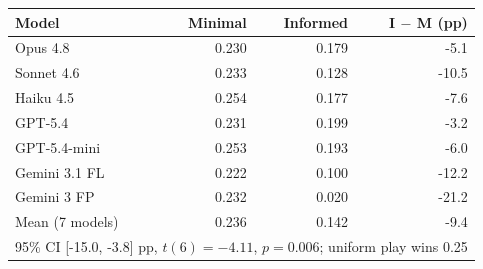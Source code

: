 \begin{tabular}{lrrr}
\toprule
Model & Minimal & Informed & I $-$ M (pp) \\
\midrule
Opus 4.8 & 0.230 & 0.179 & -5.1 \\
Sonnet 4.6 & 0.233 & 0.128 & -10.5 \\
Haiku 4.5 & 0.254 & 0.177 & -7.6 \\
GPT-5.4 & 0.231 & 0.199 & -3.2 \\
GPT-5.4-mini & 0.253 & 0.193 & -6.0 \\
Gemini 3.1 FL & 0.222 & 0.100 & -12.2 \\
Gemini 3 FP & 0.232 & 0.020 & -21.2 \\
\midrule
Mean (7 models) & 0.236 & 0.142 & -9.4 \\
\multicolumn{4}{l}{95\% CI [-15.0, -3.8] pp, $t(6) = -4.11$, $p = 0.006$; uniform play wins 0.25} \\
\bottomrule
\end{tabular}
